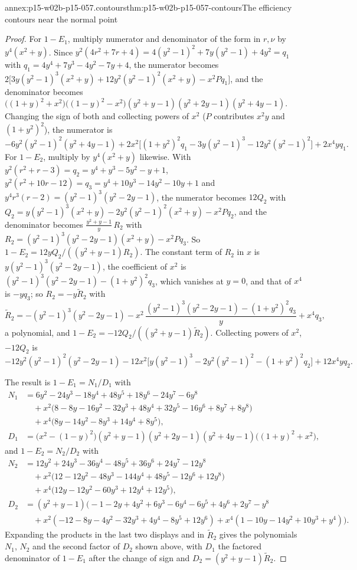 \begin{annexitem}{annex:p15-w02b-p15-057.contours}{thm:p15-w02b-p15-057-contours}{The efficiency contours near the normal point}
\begin{proof}
For \(1-E_1\), multiply numerator and denominator of the form in \(r,\nu\)
by \(y^4(x^2+y)\). Since \(y^2(4r^2+7r+4)=4(y^2-1)^2+7y(y^2-1)+4y^2
=q_1\) with \(q_1=4y^4+7y^3-4y^2-7y+4\), the numerator becomes
\(2\bigl[3y(y^2-1)^3(x^2+y)+12y^2(y^2-1)^2(x^2+y)-x^2Pq_1\bigr]\), and the
denominator becomes
\(\bigl((1+y)^2+x^2\bigr)\bigl((1-y)^2-x^2\bigr)(y^2+y-1)(y^2+2y-1)
(y^2+4y-1)\). Changing the sign of both and collecting powers of \(x^2\)
(\(P\) contributes \(x^2y\) and \((1+y^2)^2\)), the numerator is
\[
 -6y^2(y^2-1)^2(y^2+4y-1)
 +2x^2\bigl[(1+y^2)^2q_1-3y(y^2-1)^3-12y^2(y^2-1)^2\bigr]+2x^4yq_1 .
\]
For \(1-E_2\), multiply by \(y^4(x^2+y)\) likewise. With
\(y^2(r^2+r-3)=q_2=y^4+y^3-5y^2-y+1\), \(y^2(r^2+10r-12)=q_3
=y^4+10y^3-14y^2-10y+1\) and \(y^4r^3(r-2)=(y^2-1)^3(y^2-2y-1)\), the
numerator becomes \(12Q_2\) with
\(Q_2=y(y^2-1)^3(x^2+y)-2y^2(y^2-1)^2(x^2+y)-x^2Pq_2\), and the
denominator becomes \(\frac{y^2+y-1}y\,R_2\) with
\(R_2=(y^2-1)^3(y^2-2y-1)(x^2+y)-x^2Pq_3\). So
\(1-E_2=12yQ_2/((y^2+y-1)R_2)\). The constant term of \(R_2\) in \(x\) is
\(y(y^2-1)^3(y^2-2y-1)\), the coefficient of \(x^2\) is
\((y^2-1)^3(y^2-2y-1)-(1+y^2)^2q_3\), which vanishes at \(y=0\), and that
of \(x^4\) is \(-yq_3\); so \(R_2=-y\widetilde R_2\) with
\[
 \widetilde R_2=-(y^2-1)^3(y^2-2y-1)
 -x^2\,\frac{(y^2-1)^3(y^2-2y-1)-(1+y^2)^2q_3}{y}+x^4q_3 ,
\]
a polynomial, and \(1-E_2=-12Q_2/((y^2+y-1)\widetilde R_2)\). Collecting
powers of \(x^2\), \(-12Q_2\) is
\[
 -12y^2(y^2-1)^2(y^2-2y-1)
 -12x^2\bigl[y(y^2-1)^3-2y^2(y^2-1)^2-(1+y^2)^2q_2\bigr]+12x^4yq_2 .
\]

The result is \(1-E_1=N_1/D_1\) with
\begin{align*}
 N_1&=6y^2-24y^3-18y^4+48y^5+18y^6-24y^7-6y^8\\
 &\quad+x^2\bigl(8-8y-16y^2-32y^3+48y^4+32y^5-16y^6+8y^7+8y^8\bigr)\\
 &\quad+x^4\bigl(8y-14y^2-8y^3+14y^4+8y^5\bigr),\\
 D_1&=\bigl(x^2-(1-y)^2\bigr)(y^2+y-1)(y^2+2y-1)(y^2+4y-1)
 \bigl((1+y)^2+x^2\bigr),
\end{align*}
and \(1-E_2=N_2/D_2\) with
\begin{align*}
 N_2&=12y^2+24y^3-36y^4-48y^5+36y^6+24y^7-12y^8\\
 &\quad+x^2\bigl(12-12y^2-48y^3-144y^4+48y^5-12y^6+12y^8\bigr)\\
 &\quad+x^4\bigl(12y-12y^2-60y^3+12y^4+12y^5\bigr),\\
 D_2&=(y^2+y-1)\bigl(-1-2y+4y^2+6y^3-6y^4-6y^5+4y^6+2y^7-y^8\\
 &\quad+x^2(-12-8y-4y^2-32y^3+4y^4-8y^5+12y^6)
 +x^4(1-10y-14y^2+10y^3+y^4)\bigr).
\end{align*}
Expanding the products in the last two displays and in
\(\widetilde R_2\) gives the polynomials \(N_1\), \(N_2\) and the second
factor of \(D_2\) shown above, with \(D_1\) the factored denominator of
\(1-E_1\) after the change of sign and \(D_2=(y^2+y-1)\widetilde R_2\).


\end{proof}
\end{annexitem}
